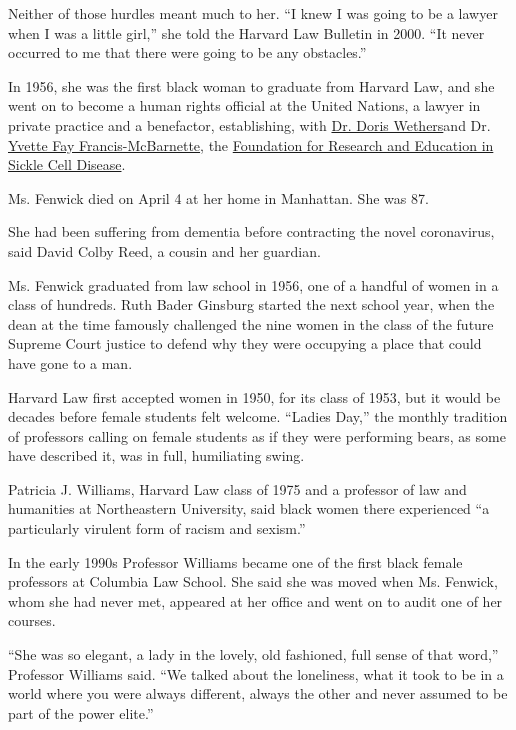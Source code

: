 Neither of those hurdles meant much to her. ``I knew I was going to be a
lawyer when I was a little girl,'' she told the Harvard Law Bulletin in
2000. ``It never occurred to me that there were going to be any
obstacles.''

In 1956, she was the first black woman to graduate from Harvard Law, and
she went on to become a human rights official at the United Nations, a
lawyer in private practice and a benefactor, establishing, with
\href{https://www.nytimes.com/2019/02/07/obituaries/dr-doris-wethers-on-front-lines-against-sickle-cell-dies-at-91.html}{Dr.
Doris Wethers}and Dr.
\href{https://www.nytimes.com/2016/04/08/nyregion/yvette-fay-francis-mcbarnette-a-pioneer-in-treating-sickle-cell-anemia-dies-at-89.html}{Yvette
Fay Francis-McBarnette}, the
\href{https://www.ncbi.nlm.nih.gov/pmc/articles/PMC2611822/}{Foundation
for Research and Education in Sickle Cell Disease}.

Ms. Fenwick died on April 4 at her home in Manhattan. She was 87.

She had been suffering from dementia before contracting the novel
coronavirus, said David Colby Reed, a cousin and her guardian.

Ms. Fenwick graduated from law school in 1956, one of a handful of women
in a class of hundreds. Ruth Bader Ginsburg started the next school
year, when the dean at the time famously challenged the nine women in
the class of the future Supreme Court justice to defend why they were
occupying a place that could have gone to a man.

Harvard Law first accepted women in 1950, for its class of 1953, but it
would be decades before female students felt welcome. ``Ladies Day,''
the monthly tradition of professors calling on female students as if
they were performing bears, as some have described it, was in full,
humiliating swing.

Patricia J. Williams, Harvard Law class of 1975 and a professor of law
and humanities at Northeastern University, said black women there
experienced ``a particularly virulent form of racism and sexism.''

In the early 1990s Professor Williams became one of the first black
female professors at Columbia Law School. She said she was moved when
Ms. Fenwick, whom she had never met, appeared at her office and went on
to audit one of her courses.

``She was so elegant, a lady in the lovely, old fashioned, full sense of
that word,'' Professor Williams said. ``We talked about the loneliness,
what it took to be in a world where you were always different, always
the other and never assumed to be part of the power elite.''

